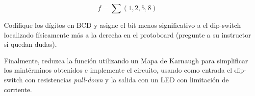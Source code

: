 $$ f = \sum{ \left( 1,2,5,8 \right)} $$

Codifique los dígitos en BCD y asigne el bit menos significativo a el dip-switch localizado físicamente más a la derecha en el protoboard 
(pregunte a su instructor si quedan dudas).

\vspace{14pt}

Finalmente, reduzca la función utilizando un Mapa de Karnaugh para simplificar los mintérminos obtenidos e implemente el circuito, usando como entrada 
el dip-switch con resistencias \emph{pull-down} y la salida con un LED con limitación de corriente.

